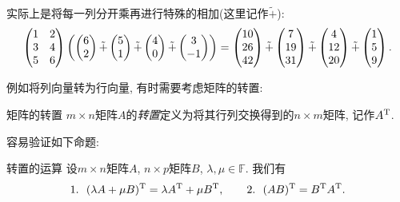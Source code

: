 实际上是将每一列分开乘再进行特殊的相加(这里记作$\tilde{+}$): $$\begin{pmatrix}
	1 & 2 \\ 3 & 4 \\ 5 & 6
\end{pmatrix} \left( \begin{pmatrix} 6 \\ 2 \end{pmatrix} \tilde{+} \begin{pmatrix} 5 \\ 1 \end{pmatrix} \tilde{+} \begin{pmatrix} 4 \\ 0 \end{pmatrix} \tilde{+} \begin{pmatrix} 3 \\ -1 \end{pmatrix} \right)
 = \begin{pmatrix} 10 \\ 26 \\ 42 \end{pmatrix} \tilde{+} \begin{pmatrix} 7 \\ 19 \\ 31 \end{pmatrix} \tilde{+} \begin{pmatrix} 4 \\ 12 \\ 20 \end{pmatrix} \tilde{+} \begin{pmatrix} 1 \\ 5 \\ 9 \end{pmatrix}.$$

例如将列向量转为行向量, 有时需要考虑矩阵的转置: 

\begin{definition}{矩阵的转置}
	$m\times n$矩阵$A$的\textit{转置}定义为将其行列交换得到的$n\times m$矩阵, 记作$A^{\operatorname{T}}$. 
\end{definition}

容易验证如下命题: 

\begin{proposition}{转置的运算}
	设$m\times n$矩阵$A$, $n\times p$矩阵$B$, $\lambda ,\mu \in \mathbb{F}$. 我们有$$1.~~(\lambda A + \mu B)^{\operatorname{T}} = \lambda A^{\operatorname{T}} + \mu B^{\operatorname{T}} ,\qquad 2.~~(AB)^{\operatorname{T}}=B^{\operatorname{T}}A^{\operatorname{T}}.$$
\end{proposition}

\newpage
